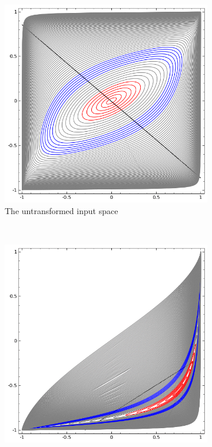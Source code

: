 \documentclass[11pt, a4paper]{article}
\begin{document}
\begin{figure}[h!tb]
    \centering
    \begin{subfigure}[t]{0.45\textwidth}
        \includegraphics[width=\textwidth]{homeomorphism_start.png}
        \caption{The untransformed input space}
        \label{fig:network-homeomorphism-start}
    \end{subfigure}
    ~ %
    \begin{subfigure}[t]{0.45\textwidth}
        \includegraphics[width=\textwidth]{homeomorphism_end_1.png}

\end{subfigure}
\end{figure}
\end{document}
